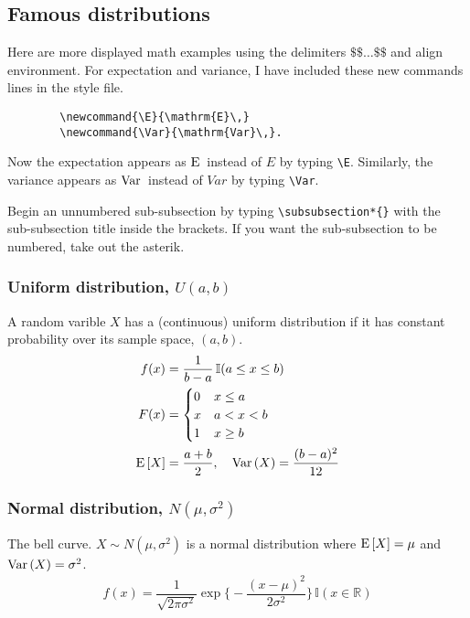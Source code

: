 \documentclass[12pt, notitlepage]{article}
\begin{document}
\subsection{Famous distributions}

\begin{notes}
Here are more displayed math examples using the delimiters $\texttt{\$\$ \ldots \$\$}$ and align environment.
For expectation and variance, I have included these new commands lines in the style file. 
        \begin{verbatim}
        \newcommand{\E}{\mathrm{E}\,}
        \newcommand{\Var}{\mathrm{Var}\,}.
        \end{verbatim}
Now the expectation appears as $\E$ instead of $E$ by typing \verb|\E|. Similarly, the variance appears as $\Var$ instead of $Var$ by typing \verb|\Var|. 
\end{notes}

\begin{notes}
Begin an unnumbered sub-subsection by typing \verb|\subsubsection*{}| with the sub-subsection title inside the brackets. If you want the sub-subsection to be numbered, take out the asterik. 
\end{notes}


\subsubsection*{Uniform distribution, $U(a,b)$}
A random varible $X$ has a (continuous) uniform distribution if it has constant probability over its sample space, $(a, b)$. 
\begin{align*}
f(x) &= \dfrac{1}{b-a}\, \mathbb{I}(a \leq x \leq b) \\
F(x) &= \begin{cases} 0 & x \leq a \\
                x & a < x < b \\
                1 & x \geq b \end{cases} \\
\E[X] &= \dfrac{a+b}{2}, \quad  \Var(X) = \dfrac{(b-a)^2}{12}
\end{align*}

\subsubsection*{Normal distribution, $\mathit{N}(\mu, \sigma^2)$}
The bell curve. $X \sim N(\mu, \sigma^2)$ is a normal distribution where $\E[X] = \mu$ and $\Var(X) = \sigma^2$. 
\begin{align*}
f(x) = \dfrac{1}{\sqrt{2\pi \sigma^2}} \exp \Big\{ - \dfrac{(x-\mu)^2}{2\sigma^2} \Big\} \, \mathbb{I}(x \in \mathbb{R})
\end{align*}
\end{document}
